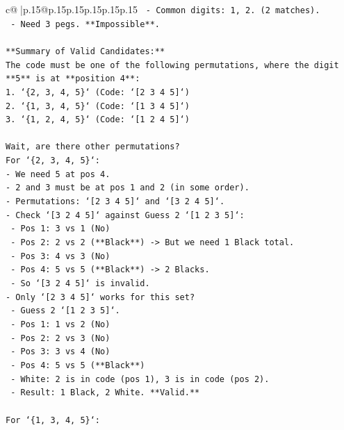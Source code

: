 \documentclass{article}
\begin{document}
{\begin{supertabular}{c@{$\;$}|p{.15\linewidth}@{}p{.15\linewidth}p{.15\linewidth}p{.15\linewidth}p{.15\linewidth}p{.15\linewidth}}
{{{\texttt{  {-} Common digits: 1, 2. (2 matches).} \\
\texttt{  {-} Need 3 pegs. **Impossible**.} \\
\\ 
\texttt{**Summary of Valid Candidates:**} \\
\texttt{The code must be one of the following permutations, where the digit **5** is at **position 4**:} \\
\texttt{1. `\{2, 3, 4, 5\}` (Code: `{[}2 3 4 5{]}`)} \\
\texttt{2. `\{1, 3, 4, 5\}` (Code: `{[}1 3 4 5{]}`)} \\
\texttt{3. `\{1, 2, 4, 5\}` (Code: `{[}1 2 4 5{]}`)} \\
\\ 
\texttt{Wait, are there other permutations?} \\
\texttt{For `\{2, 3, 4, 5\}`:} \\
\texttt{{-} We need 5 at pos 4.} \\
\texttt{{-} 2 and 3 must be at pos 1 and 2 (in some order).} \\
\texttt{{-} Permutations: `{[}2 3 4 5{]}` and `{[}3 2 4 5{]}`.} \\
\texttt{{-} Check `{[}3 2 4 5{]}` against Guess 2 `{[}1 2 3 5{]}`:} \\
\texttt{  {-} Pos 1: 3 vs 1 (No)} \\
\texttt{  {-} Pos 2: 2 vs 2 (**Black**) {-}> But we need 1 Black total.} \\
\texttt{  {-} Pos 3: 4 vs 3 (No)} \\
\texttt{  {-} Pos 4: 5 vs 5 (**Black**) {-}> 2 Blacks.} \\
\texttt{  {-} So `{[}3 2 4 5{]}` is invalid.} \\
\texttt{{-} Only `{[}2 3 4 5{]}` works for this set?} \\
\texttt{  {-} Guess 2 `{[}1 2 3 5{]}`.} \\
\texttt{  {-} Pos 1: 1 vs 2 (No)} \\
\texttt{  {-} Pos 2: 2 vs 3 (No)} \\
\texttt{  {-} Pos 3: 3 vs 4 (No)} \\
\texttt{  {-} Pos 4: 5 vs 5 (**Black**)} \\
\texttt{  {-} White: 2 is in code (pos 1), 3 is in code (pos 2).} \\
\texttt{  {-} Result: 1 Black, 2 White. **Valid.**} \\
\\ 
\texttt{For `\{1, 3, 4, 5\}`:} \\
}}}
\end{supertabular}}
\end{document}
